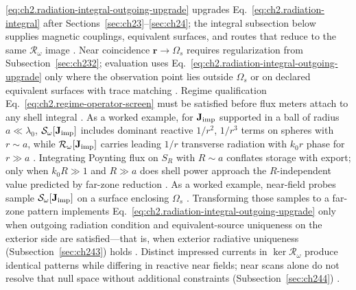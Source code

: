\eqref{eq:ch2.radiation-integral-outgoing-upgrade} upgrades
Eq.~\eqref{eq:ch2.radiation-integral} after Sections~\ref{sec:ch23}--\ref{sec:ch24};
the integral subsection below supplies magnetic couplings, equivalent surfaces, and routes
that reduce to the same $\mathcal{R}_\omega$ image \cite{harrington2001}. Near coincidence
$\mathbf{r}\to\Omega_s$ requires regularization from Subsection~\ref{sec:ch232}; evaluation
uses Eq.~\eqref{eq:ch2.radiation-integral-outgoing-upgrade} only where the observation
point lies outside $\Omega_s$ or on declared equivalent surfaces with trace matching
\cite{stratton1941}. Regime qualification
Eq.~\eqref{eq:ch2.regime-operator-screen} must be satisfied before flux meters attach to
any shell integral \cite{stratton1941}.
As a worked example, for \(\mathbf{J}_{\mathrm{imp}}\) supported in a ball of radius \(a\ll\lambda_0\), \(\mathcal{S}_\omega[\mathbf{J}_{\mathrm{imp}}]\)
includes dominant reactive \(1/r^{2}\), \(1/r^{3}\) terms on spheres with \(r\sim a\),
while \(\mathcal{R}_\omega[\mathbf{J}_{\mathrm{imp}}]\) carries leading \(1/r\) transverse radiation with
\(k_0 r\) phase for \(r\gg a\) \cite{jackson1999}. Integrating Poynting flux on \(S_R\) with
\(R\sim a\) conflates storage with export; only when \(k_0 R\gg 1\) and \(R\gg a\) does shell
power approach the \(R\)-independent value predicted by far-zone reduction
\cite{harrington2001}.
As a worked example, near-field probes sample \(\mathcal{S}_\omega[\mathbf{J}_{\mathrm{imp}}]\) on a surface enclosing \(\Omega_s\)
\cite{stratton1941}. Transforming those samples to a far-zone pattern implements
Eq.~\eqref{eq:ch2.radiation-integral-outgoing-upgrade} only when outgoing radiation condition
and equivalent-source uniqueness on the exterior side are satisfied---that is, when exterior
radiative uniqueness (Subsection~\ref{sec:ch243}) holds \cite{harrington2001}.
Distinct impressed currents in \(\ker\mathcal{R}_\omega\) produce identical patterns while
differing in reactive near fields; near scans alone do not resolve that null space without
additional constraints (Subsection~\ref{sec:ch244}) \cite{stratton1941}.
